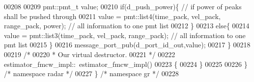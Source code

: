\begin{DoxyCode}
00208         
00209         pmt::pmt\_t value;
00210         \textcolor{keywordflow}{if}(d_push_power)\{ \textcolor{comment}{// if power of peaks shall be pushed through}
00211             value = pmt::list4(time\_pack, vel\_pack, range\_pack, power); \textcolor{comment}{// all information to one pmt list}
00212         \}
00213         \textcolor{keywordflow}{else}\{
00214             value = pmt::list3(time\_pack, vel\_pack, range\_pack); \textcolor{comment}{// all information to one pmt list}
00215         \}
00216         message\_port\_pub(d_port_id_out,value);
00217     \}
00218 
00219     \textcolor{comment}{/*}
00220 \textcolor{comment}{     * Our virtual destructor.}
00221 \textcolor{comment}{     */}
00222     estimator_fmcw_impl::~estimator_fmcw_impl()
00223     \{
00224     \}
00225 
00226   \} \textcolor{comment}{/* namespace radar */}
00227 \} \textcolor{comment}{/* namespace gr */}
00228 
\end{DoxyCode}

